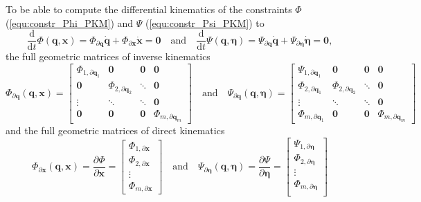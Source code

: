 \documentclass[robotics,article,submit,moreauthors,pdftex]{Definitions/mdpi}
\newcommand{\bm}[1]{\boldsymbol{#1}}
\let\Phi\varPhi
\let\Psi\varPsi
\begin{document}
To be able to compute the differential kinematics of the constraints $\bm{\Phi}$ (\ref{equ:constr_Phi_PKM}) and $\bm{\Psi}$ (\ref{equ:constr_Psi_PKM}) to
%
\begin{equation}
\frac{\mathrm{d}}{{\mathrm{d}}t} \bm{\Phi}(\bm{q},\bm{x})
=
\bm{\Phi}_{\partial \bm{q}} \dot{\bm{q}}
+
\bm{\Phi}_{\partial \bm{x}} \dot{\bm{x}}
=
\bm{0}
\quad
\mathrm{and}
\quad
\frac{\mathrm{d}}{{\mathrm{d}}t} \bm{\Psi}(\bm{q},\bm{\eta})
=
\bm{\Psi}_{\partial \bm{q}} \dot{\bm{q}}
+
\bm{\Psi}_{\partial \bm{\eta}} \dot{\bm{\eta}}
=
\bm{0},
\label{equ:constr_diff}
\end{equation}
%
the full geometric matrices of inverse kinematics
%
\begin{equation}
\bm{\Phi}_{\partial \bm{q}}(\bm{q},\bm{x})
=
\begin{bmatrix}
\bm{\Phi}_{1,\partial\bm{q}_1} & \bm{0} & \bm{0} & \bm{0}\\
\bm{0} & \bm{\Phi}_{2,\partial\bm{q}_2} & \ddots & \bm{0} \\
\vdots & \ddots & \ddots & \bm{0} \\
\bm{0} & \bm{0} & \bm{0} &\bm{\Phi}_{m,\partial\bm{q}_m}
\end{bmatrix}
\quad
\mathrm{and}
\quad
\bm{\Psi}_{\partial \bm{q}}(\bm{q},\bm{\eta})
=
\begin{bmatrix}
\bm{\Psi}_{1,\partial\bm{q}_1} & \bm{0} & \bm{0} & \bm{0}\\
\bm{\Phi}_{2,\partial\bm{q}_1} & \bm{\Phi}_{2,\partial\bm{q}_2} & \ddots & \bm{0} \\
\vdots & \ddots & \ddots & \bm{0} \\
\bm{\Phi}_{m,\partial\bm{q}_1} & \bm{0} & \bm{0} &\bm{\Phi}_{m,\partial\bm{q}_m}
\end{bmatrix}
\label{equ:PhiPsi_grad_q_complete}
\end{equation}
%
and the full geometric matrices of direct kinematics
%
\begin{equation}
\bm{\Phi}_{\partial \bm{x}}(\bm{q},\bm{x})
=
\frac{\partial \bm{\Phi}}{\partial \bm{x}}
=
\begin{bmatrix}
\bm{\Phi}_{1,\partial\bm{x}} \\
\bm{\Phi}_{2,\partial\bm{x}} \\
\vdots \\
\bm{\Phi}_{m,\partial\bm{x}}
\end{bmatrix}
\quad
\mathrm{and}
\quad
\bm{\Psi}_{\partial \bm{\eta}}(\bm{q},\bm{\eta})
=
\frac{\partial \bm{\Psi}}{\partial \bm{\eta}}
=
\begin{bmatrix}
\bm{\Psi}_{1,\partial\bm{\eta}} \\
\bm{\Phi}_{2,\partial\bm{\eta}} \\
\vdots \\
\bm{\Phi}_{m,\partial\bm{\eta}} \\
\end{bmatrix}
\label{equ:PhiPsi_grad_x_complete}
\end{equation}
\end{document}
